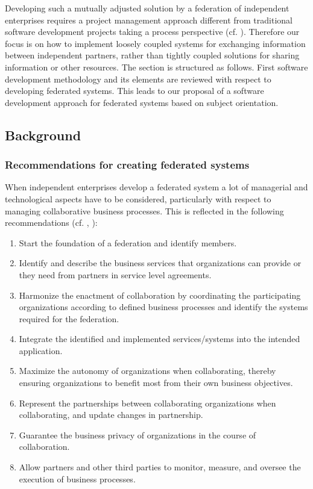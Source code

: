 Developing such a mutually adjusted solution by a federation of independent enterprises requires a project management approach different from traditional software development projects taking a process perspective (cf. \cite{book:ProjectHistory}). Therefore our focus is on how to implement loosely coupled systems for exchanging information between independent partners, rather than tightly coupled solutions for sharing information or other resources.
The section is structured as follows. First software development methodology and its elements are reviewed with respect to developing federated systems. This leads to our proposal of a software development approach for federated systems based on subject orientation. 
\\
\subsection{Background}

\subsubsection{\textbf{Recommendations for creating federated systems}}
When independent enterprises develop a federated system a lot of managerial and technological aspects have to be considered, particularly with respect to managing collaborative business processes. This is reflected in the following recommendations (cf. \cite{book:PMThirdWave} , \cite{ChallengesDistPM} ):
\begin{enumerate}
	\item Start the foundation of a federation and identify members.
	\item Identify and describe the business services that organizations can provide or they need from partners in service level agreements.
	\item Harmonize the enactment of collaboration by coordinating the participating organizations according to defined business processes and identify the systems required for the federation.
	\item Integrate the identified and implemented services/systems into the intended application. 
	\item Maximize the autonomy of organizations when collaborating, thereby ensuring organizations to benefit most from their own business objectives.
	\item Represent the partnerships between collaborating organizations when collaborating, and update changes in partnership.
	\item Guarantee the business privacy of organizations in the course of collaboration.
	\item Allow partners and other third parties to monitor, measure, and oversee the execution of business processes.
\end{enumerate}


